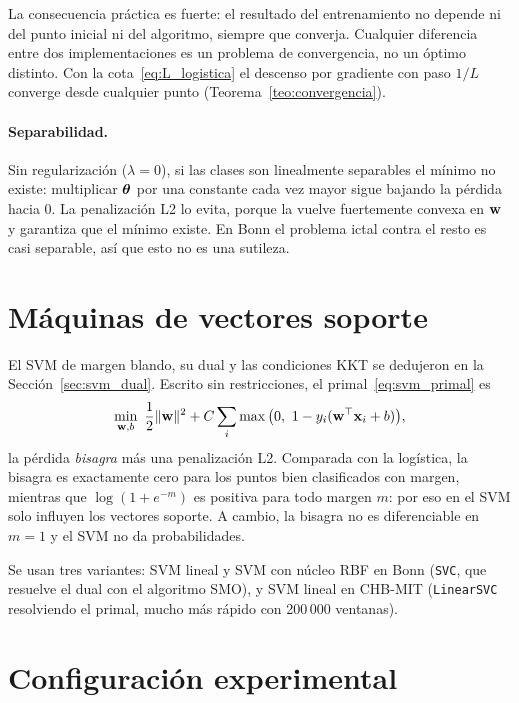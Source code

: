 La consecuencia práctica es fuerte: el resultado del entrenamiento no depende ni del punto inicial ni del algoritmo,
siempre que converja. Cualquier diferencia entre dos implementaciones es un problema de convergencia, no un óptimo
distinto. Con la cota~\eqref{eq:L_logistica} el descenso por gradiente con paso $1/L$ converge desde cualquier punto
(Teorema~\ref{teo:convergencia}).

\paragraph{Separabilidad.} Sin regularización ($\lambda = 0$), si las clases son linealmente separables el mínimo no
existe: multiplicar $\boldsymbol{\theta}$ por una constante cada vez mayor sigue bajando la pérdida hacia 0. La penalización L2 lo
evita, porque la vuelve fuertemente convexa en $\mathbf{w}$ y garantiza que el mínimo existe. En Bonn el problema ictal contra
el resto es casi separable, así que esto no es una sutileza.

\section{Máquinas de vectores soporte}
\label{sec:svm}

El SVM de margen blando, su dual y las condiciones KKT se dedujeron en la Sección~\ref{sec:svm_dual}. Escrito sin
restricciones, el primal~\eqref{eq:svm_primal} es
\begin{equation}
  \min_{\mathbf{w}, b}\ \frac12\lVert\mathbf{w}\rVert^2 + C\sum_i\max\big(0,\ 1 - y_i(\mathbf{w}^\top\mathbf{x}_i + b)\big),
\end{equation}
la pérdida \emph{bisagra} más una penalización L2. Comparada con la logística, la bisagra es exactamente cero para los
puntos bien clasificados con margen, mientras que $\log(1 + e^{-m})$ es positiva para todo margen $m$: por eso en el SVM
solo influyen los vectores soporte. A cambio, la bisagra no es diferenciable en $m = 1$ y el SVM no da probabilidades.

Se usan tres variantes: SVM lineal y SVM con núcleo RBF en Bonn (\texttt{SVC}, que resuelve el dual con el algoritmo SMO),
y SVM lineal en CHB-MIT (\texttt{LinearSVC} resolviendo el primal, mucho más rápido con 200\,000 ventanas).

\section{Configuración experimental}

